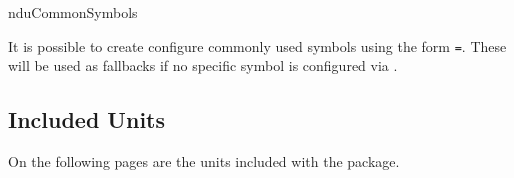 \documentclass{article}
\begin{document}
\begin{docCommand}
	{nduCommonSymbols}
	{}

	It is possible to create configure commonly used symbols using the form \texttt{=}. These will be used as fallbacks if no specific symbol is configured via .

\end{docCommand}


\clearpage
\subsection{Included Units} %

\label{units:included}
On the following pages are the units included with the package.


\clearpage
{}


\printindex  %
\end{document}
